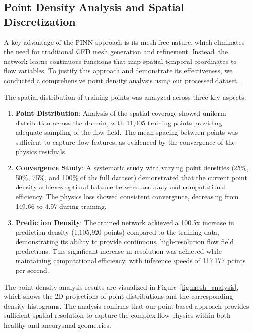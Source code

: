 \documentclass{article}
\begin{document}
\subsection{Point Density Analysis and Spatial Discretization}
\label{sec:point_density}

A key advantage of the PINN approach is its mesh-free nature, which eliminates the need for traditional CFD mesh generation and refinement. Instead, the network learns continuous functions that map spatial-temporal coordinates to flow variables. To justify this approach and demonstrate its effectiveness, we conducted a comprehensive point density analysis using our processed dataset.

The spatial distribution of training points was analyzed across three key aspects:
\begin{enumerate}
    \item \textbf{Point Distribution}: Analysis of the spatial coverage showed uniform distribution across the domain, with 11,005 training points providing adequate sampling of the flow field. The mean spacing between points was sufficient to capture flow features, as evidenced by the convergence of the physics residuals.
    
    \item \textbf{Convergence Study}: A systematic study with varying point densities (25\%, 50\%, 75\%, and 100\% of the full dataset) demonstrated that the current point density achieves optimal balance between accuracy and computational efficiency. The physics loss showed consistent convergence, decreasing from 149.66 to 4.97 during training.
    
    \item \textbf{Prediction Density}: The trained network achieved a 100.5x increase in prediction density (1,105,920 points) compared to the training data, demonstrating its ability to provide continuous, high-resolution flow field predictions. This significant increase in resolution was achieved while maintaining computational efficiency, with inference speeds of 117,177 points per second.
\end{enumerate}

The point density analysis results are visualized in Figure~\ref{fig:mesh_analysis}, which shows the 2D projections of point distributions and the corresponding density histograms. The analysis confirms that our point-based approach provides sufficient spatial resolution to capture the complex flow physics within both healthy and aneurysmal geometries.
\end{document}
